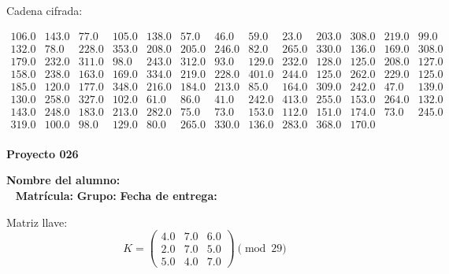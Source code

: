 \documentclass[12pt]{article}
\begin{document}
Cadena cifrada:
\begin{center}
$\begin{array}{lllllllllllll}
106.0 & 143.0 & 77.0 & 105.0 & 138.0 & 57.0 & 46.0 & 59.0 & 23.0 & 203.0 & 308.0 & 219.0 & 99.0\\
132.0 & 78.0 & 228.0 & 353.0 & 208.0 & 205.0 & 246.0 & 82.0 & 265.0 & 330.0 & 136.0 & 169.0 & 308.0\\
179.0 & 232.0 & 311.0 & 98.0 & 243.0 & 312.0 & 93.0 & 129.0 & 232.0 & 128.0 & 125.0 & 208.0 & 127.0\\
158.0 & 238.0 & 163.0 & 169.0 & 334.0 & 219.0 & 228.0 & 401.0 & 244.0 & 125.0 & 262.0 & 229.0 & 125.0\\
185.0 & 120.0 & 177.0 & 348.0 & 216.0 & 184.0 & 213.0 & 85.0 & 164.0 & 309.0 & 242.0 & 47.0 & 139.0\\
130.0 & 258.0 & 327.0 & 102.0 & 61.0 & 86.0 & 41.0 & 242.0 & 413.0 & 255.0 & 153.0 & 264.0 & 132.0\\
143.0 & 248.0 & 183.0 & 213.0 & 282.0 & 75.0 & 73.0 & 153.0 & 112.0 & 151.0 & 174.0 & 73.0 & 245.0\\
319.0 & 100.0 & 98.0 & 129.0 & 80.0 & 265.0 & 330.0 & 136.0 & 283.0 & 368.0 & 170.0\\
\end{array}$
\end{center}

\newpage


\textbf{Proyecto 026}

\textbf{Nombre del alumno:} \underline{\hspace{13cm}}\\\
\vspace{1cm}
\textbf{Matrícula:} \underline{\hspace{4cm}} \hspace{1cm}
\textbf{Grupo:} \underline{\hspace{2cm}}
\textbf{Fecha de entrega:} \underline{\hspace{2cm}}

\medskip

Matriz llave:
\[
K = \begin{pmatrix}
4.0 & 7.0 & 6.0\\
2.0 & 7.0 & 5.0\\
5.0 & 4.0 & 7.0
\end{pmatrix} \pmod{29}
\]
\end{document}
